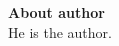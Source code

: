 \thispagestyle{empty}


\vspace*{8cm}

\noindent\textbf{{\LARGE About author}}\\



\noindent He is the author.
